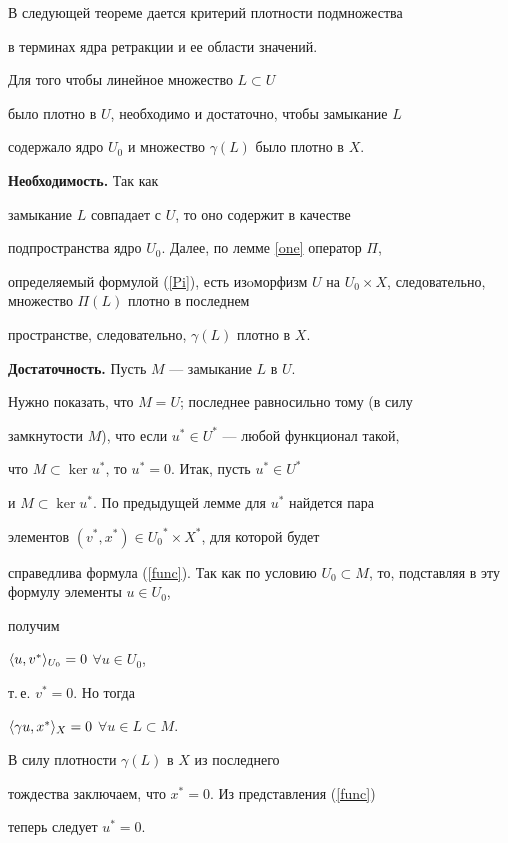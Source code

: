 В следующей теореме дается критерий плотности подмножества


в терминах ядра ретракции и ее области значений.





\begin{thms} \label{critdens}


Для того чтобы линейное множество $L \subset U$


было плотно в $U$, необходимо и достаточно, чтобы замыкание $L$


содержало ядро $U_0$ и множество $\gamma(L)$ было плотно в $X$.


\end{thms}





\begin{pf} {\bf Необходимость.} Так как


замыкание $L$ совпадает с $U$, то оно содержит в качестве


подпространства ядро $U_0$. Далее, по лемме \ref{one} оператор $\Pi$,


определяемый формулой (\ref{Pi}), есть изoморфизм $U$ на $U_0


\times X$, следовательно, множество $\Pi(L)$ плотно в последнем


пространстве, следовательно, $\gamma(L)$ плотно в $X$.


\smallskip





{\bf Достаточность.} Пусть $M$ --- замыкание $L$ в $U$.


Нужно показать, что $M=U$; последнее равносильно тому (в силу


замкнутости $M$), что если $u^* \in U^*$ --- любой функционал такой,


что $M \subset \ker u^*$, то $u^*=0$. Итак, пусть $u^* \in U^*$


и $M \subset \ker u^*$. По предыдущей лемме для $u^*$ найдется пара


элементов $(v^*, x^*) \in {U_0}^* \times X^*$, для которой будет


справедлива формула (\ref{func}). Так как по условию $U_0


\subset M$, то, подставляя в эту формулу элементы $u \in U_0$,


получим


$\langle u, v^*\rangle _{U_0}=0$\; $\forall u \in U_0$,


т.\,е. $v^*=0$. Но тогда


$\langle \gamma u, x^*\rangle _X=0$\; $\forall u \in L \subset M$.


В силу плотности $\gamma(L)$ в $X$ из последнего


тождества заключаем, что $x^*=0$. Из представления (\ref{func})


теперь следует $u^*=0$.


\end{pf}





